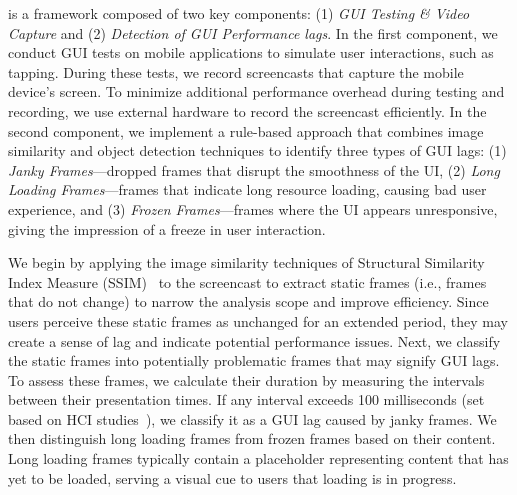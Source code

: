 \tool is a framework composed of two key components: (1) \textit{GUI Testing \& Video Capture} and (2) \textit{Detection of GUI Performance lags}. In the first component, we conduct GUI tests on mobile applications to simulate user interactions, such as tapping. During these tests, we record screencasts that capture the mobile device's screen. To minimize additional performance overhead during testing and recording, we use external hardware to record the screencast efficiently. 
In the second component, we implement a rule-based approach that combines image similarity and object detection techniques to identify three types of GUI lags: (1) \textit{Janky Frames}---dropped frames that disrupt the smoothness of the UI, (2) \textit{Long Loading Frames}---frames that indicate long resource loading, causing bad user experience, and (3) \textit{Frozen Frames}---frames where the UI appears unresponsive, giving the impression of a freeze in user interaction. 

We begin by applying the image similarity techniques of Structural Similarity Index Measure (SSIM)~\cite{2004_SSIM_Transactions_on_Image_Processing} to the screencast to extract static frames (i.e., frames that do not change) to narrow the analysis scope and improve efficiency. Since users perceive these static frames as unchanged for an extended period, they may create a sense of lag and indicate potential performance issues.
Next, we classify the static frames into potentially problematic frames that may signify GUI lags. To assess these frames, we calculate their duration by measuring the intervals between their presentation times. If any interval exceeds 100 milliseconds (set based on HCI studies~\cite{1968_AFIPS_Response_time_in_man_computer, 1994_Usability_Engineering, zippy_Android_apps, 2015_MOBILESoft_performance_parameters}), we classify it as a GUI lag caused by janky frames. We then distinguish long loading frames from frozen frames based on their content. Long loading frames typically contain a placeholder representing content that has yet to be loaded, serving a visual cue to users that loading is in progress. 

